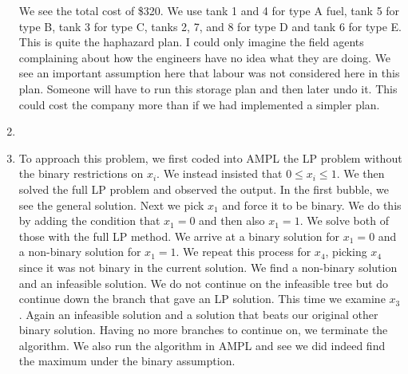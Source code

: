 \documentclass[11pt]{article}
\begin{document}
\begin{enumerate}
We see the total cost of \$320.  We use tank 1 and 4 for type A fuel, tank 5 for type B, tank 3 for type C, tanks 2, 7, and 8 for type D and tank 6 for type E.  This is quite the haphazard plan.  I could only imagine the field agents complaining about how the engineers have no idea what they are doing.  We see an important assumption here that labour was not considered here in this plan.    Someone will have to run this storage plan and then later undo it.  This could cost the company more than if we had implemented a simpler plan.
\item 
\item To approach this problem, we first coded into AMPL the LP problem without the binary restrictions on $x_i$.  We instead insisted that $0\leq x_i\leq 1$.  We then solved the full LP problem and observed the output.  In the first bubble, we see the general solution.  Next we pick $x_1$ and force it to be binary.  We do this by adding the condition that $x_1 = 0$ and then also $x_1 = 1$.  We solve both of those with the full LP method.  We arrive at a binary solution for $x_1 = 0$ and a non-binary solution for $x_1 = 1$.  We repeat this process for $x_4$, picking $x_4$ since it was not binary in the current solution.  We find a non-binary solution and an infeasible solution.  We do not continue on the infeasible tree but do continue down the branch that gave an LP solution.  This time we examine $x_3$.  Again an infeasible solution and a solution that beats our original other binary solution.  Having no more branches to continue on, we terminate the algorithm.  We also run the algorithm in AMPL and see we did indeed find the maximum under the binary assumption.

\end{enumerate}
\end{document}
